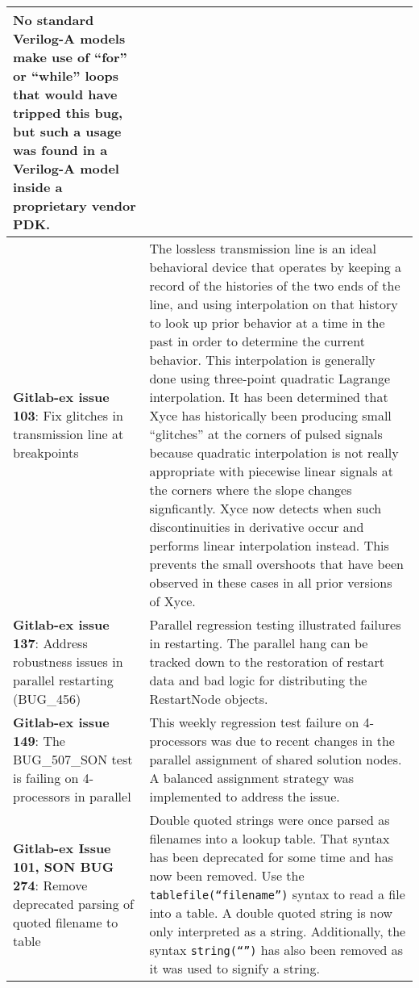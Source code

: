 {\begin{longtable}[h] {>{\raggedright\small}m{2in}|>{\raggedright\let\\\tabularnewline\small}m{3.5in}}
No standard Verilog-A models make use of ``for'' or ``while'' loops
that would have tripped this bug, but such a usage was found in a
Verilog-A model inside a proprietary vendor PDK. \\ \hline

\textbf{Gitlab-ex issue 103}: Fix glitches in transmission line at breakpoints &
The lossless transmission line is an ideal behavioral device that
operates by keeping a record of the histories of the two ends of the
line, and using interpolation on that history to look up prior
behavior at a time in the past in order to determine the current
behavior.  This interpolation is generally done using three-point
quadratic Lagrange interpolation.  It has been determined that Xyce
has historically been producing small ``glitches'' at the corners of
pulsed signals because quadratic interpolation is not really
appropriate with piecewise linear signals at the corners where the
slope changes signficantly.  Xyce now detects when such
discontinuities in derivative occur and performs linear interpolation
instead.  This prevents the small overshoots that have been observed
in these cases in all prior versions of Xyce. \\ \hline

\textbf{Gitlab-ex issue 137}: Address robustness issues in parallel restarting (BUG\_456) &
Parallel regression testing illustrated failures in restarting.  The
parallel hang can be tracked down to the restoration of restart data
and bad logic for distributing the RestartNode objects. \\ \hline

\textbf{Gitlab-ex issue 149}: The BUG\_507\_SON test is failing on 4-processors in parallel &
This weekly regression test failure on 4-processors was due to recent
changes in the parallel assignment of shared solution nodes.  A
balanced assignment strategy was implemented to address the
issue. \\ \hline

\textbf{Gitlab-ex Issue 101, SON BUG 274}:  Remove deprecated parsing of quoted filename to table &
Double quoted strings were once parsed as filenames into a lookup
table.  That syntax has been deprecated for some time and has now been
removed. Use the \texttt{tablefile(``filename'')} syntax to read a
file into a table.  A double quoted string is now only interpreted as
a string.  Additionally, the syntax \texttt{string(``'')} has also
been removed as it was used to signify a string.
\\ \hline


\end{longtable}}
